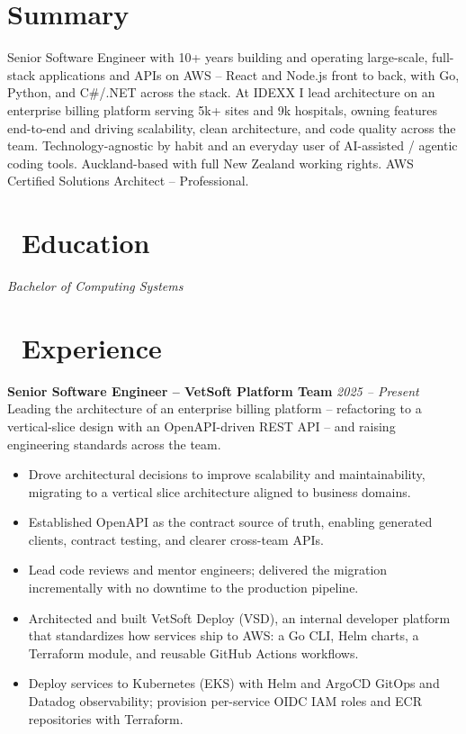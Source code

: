 \documentclass{resume}
\begin{document}


  \vspace{2em}

\section*{Summary}
Senior Software Engineer with 10+ years building and operating large-scale, full-stack applications and APIs on AWS -- React and Node.js front to back, with Go, Python, and C\#/.NET across the stack. At IDEXX I lead architecture on an enterprise billing platform serving 5k+ sites and 9k hospitals, owning features end-to-end and driving scalability, clean architecture, and code quality across the team. Technology-agnostic by habit and an everyday user of AI-assisted / agentic coding tools. Auckland-based with full New Zealand working rights. AWS Certified Solutions Architect -- Professional.

\section{\faGraduationCap\ Education}
\textit{Bachelor of Computing Systems}


\section{\faUsers\ Experience}
\vspace{1em}
\textbf{Senior Software Engineer -- VetSoft Platform Team} \hfill \textit{2025 -- Present} \\
Leading the architecture of an enterprise billing platform -- refactoring to a vertical-slice design with an OpenAPI-driven REST API -- and raising engineering standards across the team.
\begin{itemize}
  \item Drove architectural decisions to improve scalability and maintainability, migrating to a vertical slice architecture aligned to business domains.
  \item Established OpenAPI as the contract source of truth, enabling generated clients, contract testing, and clearer cross-team APIs.
  \item Lead code reviews and mentor engineers; delivered the migration incrementally with no downtime to the production pipeline.
  \item Architected and built VetSoft Deploy (VSD), an internal developer platform that standardizes how services ship to AWS: a Go CLI, Helm charts, a Terraform module, and reusable GitHub Actions workflows.
  \item Deploy services to Kubernetes (EKS) with Helm and ArgoCD GitOps and Datadog observability; provision per-service OIDC IAM roles and ECR repositories with Terraform.
\end{itemize}
\end{document}
